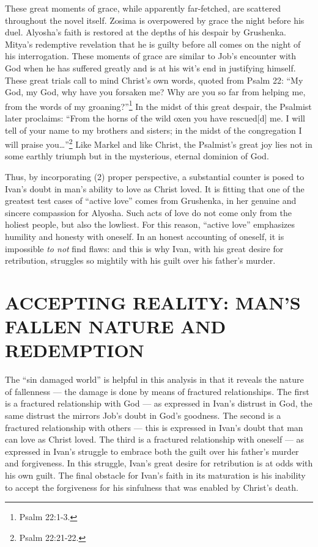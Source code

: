 These great moments of grace, while apparently far-fetched, are scattered throughout the novel itself. Zosima is overpowered by grace the night before his duel. Alyosha's faith is restored at the depths of his despair by Grushenka. Mitya's redemptive revelation that he is guilty before all comes on the night of his interrogation. These moments of grace are similar to Job's encounter with God when he has suffered greatly and is at his wit's end in justifying himself. These great trials call to mind Christ's own words, quoted from Psalm 22: ``My God, my God, why have you forsaken me? Why are you so far from helping me, from the words of my groaning?''\footnote{Psalm 22:1-3.} In the midst of this great despair, the Psalmist later proclaims: ``From the horns of the wild oxen you have rescued[d] me. I will tell of your name to my brothers and sisters; in the midst of the congregation I will praise you\ldots''\footnote{Psalm 22:21-22.} Like Markel and like Christ, the Psalmist's great joy lies not in some earthly triumph but in the mysterious, eternal dominion of God. 

Thus, by incorporating (2) proper perspective, a substantial counter is posed to Ivan's doubt in man's ability to love as Christ loved. It is fitting that one of the greatest test cases of ``active love'' comes from Grushenka, in her genuine and sincere compassion for Alyosha. Such acts of love do not come only from the holiest people, but also the lowliest. For this reason, ``active love'' emphasizes humility and honesty with oneself. In an honest accounting of oneself, it is impossible \emph{to not} find flaws: and this is why Ivan, with his great desire for retribution, struggles so mightily with his guilt over his father's murder.

\chapter{ACCEPTING REALITY: MAN'S FALLEN NATURE AND REDEMPTION}
The ``sin damaged world'' is helpful in this analysis in that it reveals the nature of fallenness --- the damage is done by means of fractured relationships. The first is a fractured relationship with God --- as expressed in Ivan's distrust in God, the same distrust the mirrors Job's doubt in God's goodness. The second is a fractured relationship with others --- this is expressed in Ivan's doubt that man can love as Christ loved. The third is a fractured relationship with oneself --- as expressed in Ivan's struggle to embrace both the guilt over his father's murder and forgiveness. In this struggle, Ivan's great desire for retribution is at odds with his own guilt. The final obstacle for Ivan's faith in its maturation is his inability to accept the forgiveness for his sinfulness that was enabled by Christ's death.

